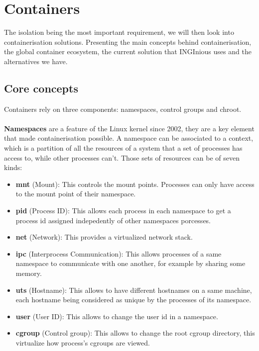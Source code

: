 \section{Containers}
The isolation being the most important requirement, we will then look into containerisation solutions.  Presenting the main concepts behind containerisation, the global container ecosystem, the current solution that INGInious uses and the alternatives we have.

\subsection{Core concepts}
Containers rely on three components: namespaces, control groups and chroot.
\paragraph{}\textbf{Namespaces} are a feature of the Linux kernel since 2002, they are a key element that made containerisation possible.  A namespace can be associated to a context, which is a partition of all the resources of a system that a set of processes has access to, while other processes can't.  Those sets of resources can be of seven kinds:
\begin{itemize}
\renewcommand\labelitemi{--}
  \item \textbf{mnt} (Mount): This controls the mount points.  Processes can only have access to the mount point of their namespace.
  \item \textbf{pid} (Process ID): This allows each process in each namespace to get a process id assigned indepedently of other namespaces porcesses.
  \item \textbf{net} (Network): This provides a virtualized network stack.
  \item \textbf{ipc} (Interprocess Communication): This allows processes of a same namespace to communicate with one another, for example by sharing some memory.
  \item \textbf{uts} (Hostname): This allows to have different hostnames on a same machine, each hostname being considered as unique by the processes of its namespace.
  \item \textbf{user} (User ID): This allows to change the user id in a namespace.
  \item \textbf{cgroup} (Control group): This allows to change the root cgroup directory, this virtualize how process's cgroups are viewed.
\end{itemize}

